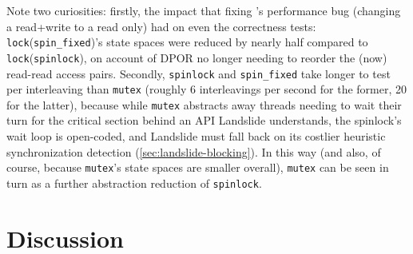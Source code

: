 Note two curiosities:
firstly,
the impact that fixing 's performance bug
(changing a read+write to a read only)
had on even the correctness tests:
{\tt lock}({\tt spin\_fixed})'s state spaces were reduced by nearly half compared to {\tt lock}({\tt spinlock}),
on account of DPOR no longer needing to reorder the (now) read-read access pairs.
Secondly, {\tt spinlock} and {\tt spin\_fixed} take longer to test per interleaving
than {\tt mutex}
(roughly 6 interleavings per second for the former, 20 for the latter),
because while {\tt mutex} abstracts away threads needing to wait their turn for the critical section
behind an API Landslide understands,
the spinlock's wait loop is open-coded, and Landslide must fall back on its costlier heuristic synchronization detection
(\cref{sec:landslide-blocking}).
In this way (and also, of course, because {\tt mutex}'s state spaces are smaller overall),
{\tt mutex} can be seen in turn as a further abstraction reduction of {\tt spinlock}.





\section{Discussion}
\label{sec:tm-discussion}

